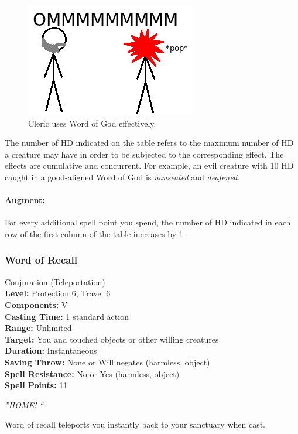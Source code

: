 \begin{figure}
  \caption{Cleric uses Word of God effectively.}
  \centering
    \includegraphics{Pics/WordOfGod.png}
\end{figure}

The number of HD indicated on the table refers to the maximum number of HD a creature may have in order to be subjected to the corresponding effect.
The effects are cumulative and concurrent.
For example, an evil creature with 10 HD caught in a good-aligned Word of God is \emph{nauseated} and \emph{deafened}.

\paragraph{Augment:} For every additional spell point you spend, the number of HD indicated in each row of the first column of the  table increases by 1.
\subsubsection{Word of Recall}
\label{Spell:WordOfRecall}
Conjuration (Teleportation)
\\ \textbf{Level:} Protection 6, Travel 6
\\ \textbf{Components:} V
\\ \textbf{Casting Time:} 1 standard action
\\ \textbf{Range:} Unlimited
\\ \textbf{Target:} You and touched objects or other willing creatures
\\ \textbf{Duration:} Instantaneous
\\ \textbf{Saving Throw:} None or Will negates (harmless, object)
\\ \textbf{Spell Resistance:} No or Yes (harmless, object)
\\ \textbf{Spell Points:} 11

\emph{''HOME! ``}

Word of recall teleports you instantly back to your sanctuary when cast. 

